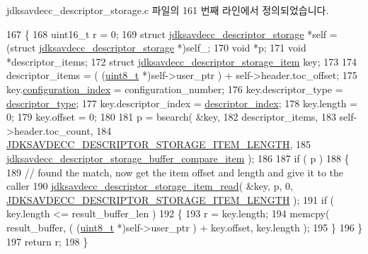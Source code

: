 jdksavdecc\+\_\+descriptor\+\_\+storage.\+c 파일의 161 번째 라인에서 정의되었습니다.


\begin{DoxyCode}
167 \{
168     uint16\_t r = 0;
169     \textcolor{keyword}{struct }\hyperlink{structjdksavdecc__descriptor__storage}{jdksavdecc\_descriptor\_storage} *\textcolor{keyword}{self} = (\textcolor{keyword}{struct }
      \hyperlink{structjdksavdecc__descriptor__storage}{jdksavdecc\_descriptor\_storage} *)self\_;
170     \textcolor{keywordtype}{void} *p;
171     \textcolor{keywordtype}{void} *descriptor\_items;
172     \textcolor{keyword}{struct }\hyperlink{structjdksavdecc__descriptor__storage__item}{jdksavdecc\_descriptor\_storage\_item} key;
173 
174     descriptor\_items = ( (\hyperlink{stdint_8h_aba7bc1797add20fe3efdf37ced1182c5}{uint8\_t} *)self->user\_ptr ) + \textcolor{keyword}{self}->header.toc\_offset;
175     key.\hyperlink{structjdksavdecc__descriptor__storage__item_afaad1bd7c66f9611e134d8c5ce98f444}{configuration\_index} = configuration\_number;
176     key.descriptor\_type = \hyperlink{structjdksavdecc__descriptor__storage__item_ab7c32b6c7131c13d4ea3b7ee2f09b78d}{descriptor\_type};
177     key.descriptor\_index = \hyperlink{structjdksavdecc__descriptor__storage__item_a042bbc76d835b82d27c1932431ee38d4}{descriptor\_index};
178     key.length = 0;
179     key.offset = 0;
180 
181     p = bsearch( &key,
182                  descriptor\_items,
183                  self->header.toc\_count,
184                  \hyperlink{group__descriptor__storage__item_ga929fd9464abbbbf3d66fc15109d022b3}{JDKSAVDECC\_DESCRIPTOR\_STORAGE\_ITEM\_LENGTH},
185                  \hyperlink{jdksavdecc__descriptor__storage_8c_a375d7381ac31b3385669fdba52c06bdb}{jdksavdecc\_descriptor\_storage\_buffer\_compare\_item}
       );
186 
187     \textcolor{keywordflow}{if} ( p )
188     \{
189         \textcolor{comment}{// found the match, now get the item offset and length and give it to the caller}
190         \hyperlink{group__descriptor__storage__item_gab105c3730864b355b06526c4ad53af7a}{jdksavdecc\_descriptor\_storage\_item\_read}( &key, p, 0, 
      \hyperlink{group__descriptor__storage__item_ga929fd9464abbbbf3d66fc15109d022b3}{JDKSAVDECC\_DESCRIPTOR\_STORAGE\_ITEM\_LENGTH} );
191         \textcolor{keywordflow}{if} ( key.length <= result\_buffer\_len )
192         \{
193             r = key.length;
194             memcpy( result\_buffer, ( (\hyperlink{stdint_8h_aba7bc1797add20fe3efdf37ced1182c5}{uint8\_t} *)self->user\_ptr ) + key.offset, key.length );
195         \}
196     \}
197     \textcolor{keywordflow}{return} r;
198 \}
\end{DoxyCode}



